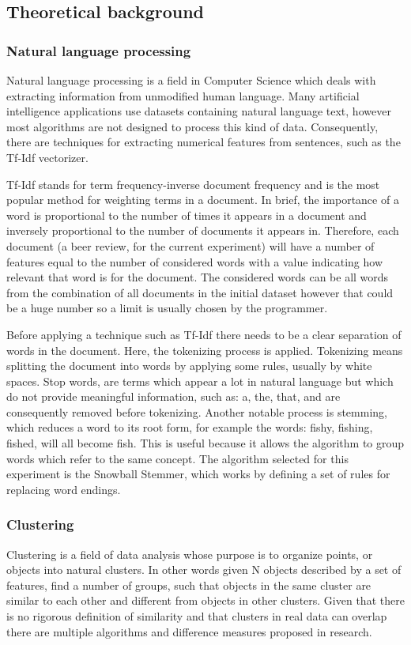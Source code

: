 \documentclass[12pt]{article}
\begin{document}
	\subsection{Theoretical background}
	
	\subsubsection{Natural language processing}
	Natural language processing is a field in Computer Science which deals with extracting information from unmodified human language. Many artificial intelligence applications use datasets containing natural language text, however most algorithms are not designed to process this kind of data. Consequently, there are techniques for extracting numerical features from sentences, such as the Tf-Idf vectorizer. 
	
	Tf-Idf\cite{TfIdfBook} stands for term frequency-inverse document frequency and is the most popular method for weighting terms in a document. In brief, the importance of a word is proportional to the number of times it appears in a document and inversely proportional to the number of documents it appears in. Therefore, each document (a beer review, for the current experiment) will have a number of features equal to the number of considered words with a value indicating how relevant that word is for the document. The considered words can be all words from the combination of all documents in the initial dataset however that could be a huge number so a limit is usually chosen by the programmer.
	
	Before applying a technique such as Tf-Idf there needs to be a clear separation of words in the document. Here, the tokenizing process is applied. Tokenizing means splitting the document into words by applying some rules, usually by white spaces. Stop words, are terms which appear a lot in natural language but which do not provide meaningful information, such as: a, the, that, and are consequently removed before tokenizing. Another notable process is stemming, which reduces a word to its root form, for example the words: fishy, fishing, fished, will all become fish. This is useful because it allows the algorithm to group words which refer to the same concept. The algorithm selected for this experiment is the Snowball Stemmer\cite{SnowballStemmer}, which works by defining a set of rules for replacing word endings.

	\subsubsection{Clustering}
	Clustering is a field of data analysis whose purpose is to organize points, or objects into natural clusters. In other words given N objects described by a set of features, find a number of groups, such that objects in the same cluster are similar to each other and different from objects in other clusters\cite{DataClustering50yearsBeyondKmeans}. Given that there is no rigorous definition of similarity and that clusters in real data can overlap there are multiple algorithms and difference measures proposed in research.
	
\end{document}
